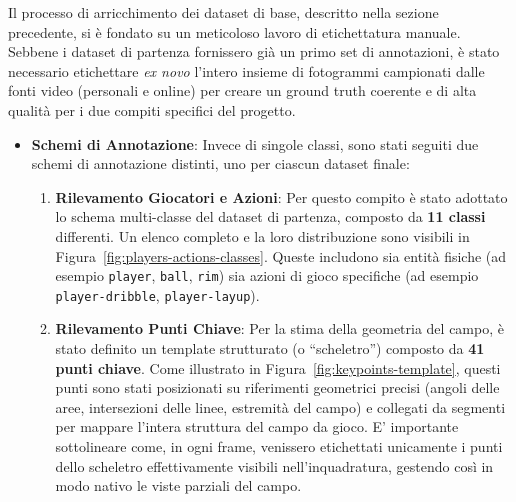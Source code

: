 \documentclass[12pt,a4paper,openright,twoside]{book}
\begin{document}
\noindent Il processo di arricchimento dei dataset di base, 
descritto nella sezione precedente, si è fondato su un 
meticoloso lavoro di etichettatura manuale. Sebbene i dataset 
di partenza fornissero già un primo set di annotazioni, è 
stato necessario etichettare \emph{ex novo} l'intero 
insieme di fotogrammi campionati dalle fonti video 
(personali e online) per creare un ground truth coerente 
e di alta qualità per i due compiti specifici del progetto.

\begin{itemize}
  \item \textbf{Schemi di Annotazione}: Invece di singole classi, 
  sono stati seguiti due schemi di annotazione distinti, uno per 
  ciascun dataset finale:
  \begin{enumerate}
    \item \textbf{Rilevamento Giocatori e Azioni}: Per questo compito 
    è stato adottato lo schema multi-classe del dataset di partenza, 
    composto da \textbf{11 classi} differenti. Un elenco completo e 
    la loro distribuzione sono visibili in Figura~\ref{fig:players-actions-classes}. 
    Queste includono sia entità fisiche (ad esempio \texttt{player}, 
    \texttt{ball}, \texttt{rim}) sia azioni di gioco specifiche 
    (ad esempio \texttt{player-dribble}, \texttt{player-layup}).
      
    \item \textbf{Rilevamento Punti Chiave}: Per la stima della 
    geometria del campo, è stato definito un template strutturato 
    (o ``scheletro'') composto da \textbf{41 punti chiave}. 
    Come illustrato in Figura~\ref{fig:keypoints-template}, 
    questi punti sono stati posizionati su riferimenti geometrici 
    precisi (angoli delle aree, intersezioni delle linee, estremità 
    del campo) e collegati da segmenti per mappare l'intera struttura 
    del campo da gioco. E' importante sottolineare come, in ogni frame, 
    venissero etichettati unicamente i punti dello scheletro 
    effettivamente visibili nell'inquadratura, gestendo così in 
    modo nativo le viste parziali del campo.
  \end{enumerate}
\end{itemize}
\end{document}
